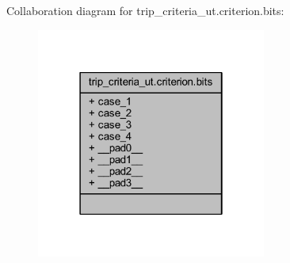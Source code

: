 Collaboration diagram for trip\+\_\+criteria\+\_\+ut.\+criterion.\+bits\+:\nopagebreak
\begin{figure}[H]
\begin{center}
\leavevmode
\includegraphics[width=214pt]{d3/d7b/a00986}
\end{center}
\end{figure}
